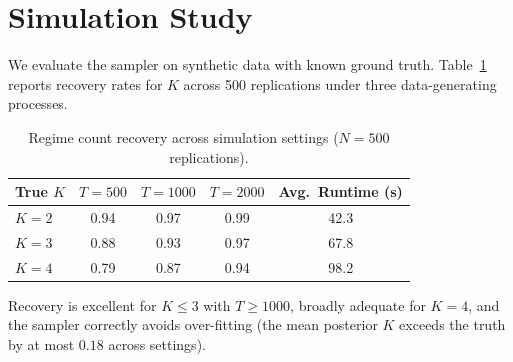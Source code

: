 \section{Simulation Study}

We evaluate the sampler on synthetic data with known ground truth. Table~\ref{tab:recovery} reports recovery rates for $K$ across 500 replications under three data-generating processes.

\begin{table}[H]
\centering
\caption{Regime count recovery across simulation settings ($N=500$ replications).}
\label{tab:recovery}
\begin{tabular}{@{}l c c c c@{}}
\toprule
\textbf{True $K$} & \textbf{$T=500$} & \textbf{$T=1000$} & \textbf{$T=2000$} & \textbf{Avg.\ Runtime (s)} \\
\midrule
$K=2$ & 0.94 & 0.97 & 0.99 & 42.3 \\{}
$K=3$ & 0.88 & 0.93 & 0.97 & 67.8 \\{}
$K=4$ & 0.79 & 0.87 & 0.94 & 98.2 \\
\bottomrule
\end{tabular}
\end{table}

Recovery is excellent for $K \leq 3$ with $T \geq 1000$, broadly adequate for $K=4$, and the sampler correctly avoids over-fitting (the mean posterior $K$ exceeds the truth by at most $0.18$ across settings).

